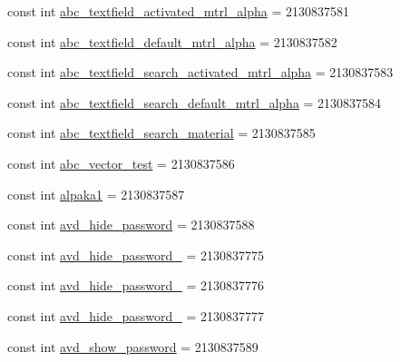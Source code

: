 \begin{DoxyCompactItemize}
\item 
const int \mbox{\hyperlink{class_f_w_p_s___app_1_1_droid_1_1_resource_1_1_drawable_aa650503908a2c622106a6a119981e46a}{abc\+\_\+textfield\+\_\+activated\+\_\+mtrl\+\_\+alpha}} = 2130837581
\item 
const int \mbox{\hyperlink{class_f_w_p_s___app_1_1_droid_1_1_resource_1_1_drawable_a410c247ea21d8668dbe67d3823033825}{abc\+\_\+textfield\+\_\+default\+\_\+mtrl\+\_\+alpha}} = 2130837582
\item 
const int \mbox{\hyperlink{class_f_w_p_s___app_1_1_droid_1_1_resource_1_1_drawable_a6724fed24381176c0dba64c1d1405ded}{abc\+\_\+textfield\+\_\+search\+\_\+activated\+\_\+mtrl\+\_\+alpha}} = 2130837583
\item 
const int \mbox{\hyperlink{class_f_w_p_s___app_1_1_droid_1_1_resource_1_1_drawable_a4f60becc679fc4f017a298b011fa44cd}{abc\+\_\+textfield\+\_\+search\+\_\+default\+\_\+mtrl\+\_\+alpha}} = 2130837584
\item 
const int \mbox{\hyperlink{class_f_w_p_s___app_1_1_droid_1_1_resource_1_1_drawable_a3f46f68a60252e35802b0ba195ec4c7d}{abc\+\_\+textfield\+\_\+search\+\_\+material}} = 2130837585
\item 
const int \mbox{\hyperlink{class_f_w_p_s___app_1_1_droid_1_1_resource_1_1_drawable_ad308cd0db3a7ffb0d324941c3dea99df}{abc\+\_\+vector\+\_\+test}} = 2130837586
\item 
const int \mbox{\hyperlink{class_f_w_p_s___app_1_1_droid_1_1_resource_1_1_drawable_a57753fed0dce20b37a8ce7e3a624ac8a}{alpaka1}} = 2130837587
\item 
const int \mbox{\hyperlink{class_f_w_p_s___app_1_1_droid_1_1_resource_1_1_drawable_a248edd42b0e376f04b004195ceac59e5}{avd\+\_\+hide\+\_\+password}} = 2130837588
\item 
const int \mbox{\hyperlink{class_f_w_p_s___app_1_1_droid_1_1_resource_1_1_drawable_a10d2ba0f38fff1c33d4a82043d79e5f5}{avd\+\_\+hide\+\_\+password\+\_}} = 2130837775
\item 
const int \mbox{\hyperlink{class_f_w_p_s___app_1_1_droid_1_1_resource_1_1_drawable_a5abd9f2a9cf0aee0356d354ebad8f9f9}{avd\+\_\+hide\+\_\+password\+\_}} = 2130837776
\item 
const int \mbox{\hyperlink{class_f_w_p_s___app_1_1_droid_1_1_resource_1_1_drawable_a62bf3350155b9d481fd579053b79c767}{avd\+\_\+hide\+\_\+password\+\_}} = 2130837777
\item 
const int \mbox{\hyperlink{class_f_w_p_s___app_1_1_droid_1_1_resource_1_1_drawable_a229acb4b75b2f0dbb8947887d3e29f8a}{avd\+\_\+show\+\_\+password}} = 2130837589

\end{DoxyCompactItemize}
